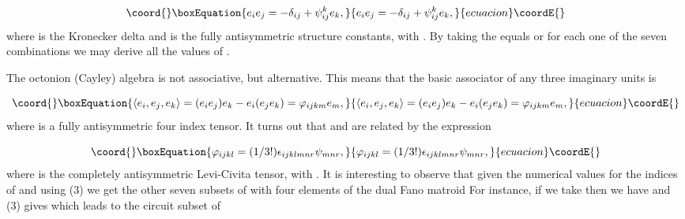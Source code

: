 \documentclass[a4paper,12pt]{article}
\begin{document}
\begin{equation}\coord{}\boxEquation{
e_{i}e_{j}=-\delta _{ij}+\psi _{ij}^{k}e_{k},  \label{1}
}{
e_{i}e_{j}=-\delta _{ij}+\psi _{ij}^{k}e_{k},  }{ecuacion}\coordE{}\end{equation}
where \coordHE{} is the Kronecker delta and \coordHE{}  \coordHE{} is the fully antisymmetric structure constants, with \coordHE{}. By taking the \coordHE{} equals \coordHE{} or \coordHE{} for each one
of the seven combinations \coordHE{} we may derive all the values of \coordHE{}.

The octonion (Cayley) algebra is not associative, but alternative. This
means that the basic associator of any three imaginary units is

\begin{equation}\coord{}\boxEquation{
\langle e_{i},e_{j},e_{k}\rangle
=(e_{i}e_{j})e_{k}-e_{i}(e_{j}e_{k})=\varphi _{ijkm}e_{m},  \label{2}
}{
\langle e_{i},e_{j},e_{k}\rangle
=(e_{i}e_{j})e_{k}-e_{i}(e_{j}e_{k})=\varphi _{ijkm}e_{m},  }{ecuacion}\coordE{}\end{equation}
where \coordHE{} is a fully antisymmetric four index tensor. It turns
out that \coordHE{} and \coordHE{} are related by the expression

\begin{equation}\coord{}\boxEquation{
\varphi _{ijkl}=(1/3!)\epsilon _{ijklmnr}\psi _{mnr},  \label{3}
}{
\varphi _{ijkl}=(1/3!)\epsilon _{ijklmnr}\psi _{mnr},  }{ecuacion}\coordE{}\end{equation}
where \coordHE{} is the completely antisymmetric Levi-Civita
tensor, with \coordHE{}. It is interesting to observe that given
the numerical values \coordHE{} for the indices of \coordHE{} and using (3)
we get the other seven subsets of \coordHE{} with four elements of the dual Fano
matroid \coordHE{} For instance, if we take \coordHE{} then we have \coordHE{} and (3) gives \coordHE{} which leads to the circuit subset \coordHE{} of \coordHE{}
\end{document}

